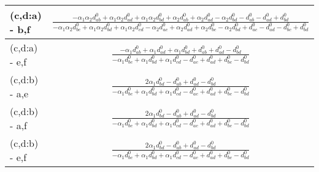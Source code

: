 \documentclass[12pt]{article}
\begin{document}
\begin{longtable}{l|c}
(c,d:a) - b,f& {$\displaystyle \frac{- \alpha_{1} \alpha_{2} d^{\scriptscriptstyle 0}_{ab} + \alpha_{1} \alpha_{2} d^{\scriptscriptstyle 0}_{ad} + \alpha_{1} \alpha_{2} d^{\scriptscriptstyle 0}_{bd} + \alpha_{2} d^{\scriptscriptstyle 0}_{ab} + \alpha_{2} d^{\scriptscriptstyle 0}_{ad} - \alpha_{2} d^{\scriptscriptstyle 0}_{bd} - d^{\scriptscriptstyle 0}_{ab} - d^{\scriptscriptstyle 0}_{ad} + d^{\scriptscriptstyle 0}_{bd}}{- \alpha_{1} \alpha_{2} d^{\scriptscriptstyle 0}_{bc} + \alpha_{1} \alpha_{2} d^{\scriptscriptstyle 0}_{bd} + \alpha_{1} \alpha_{2} d^{\scriptscriptstyle 0}_{cd} - \alpha_{2} d^{\scriptscriptstyle 0}_{ac} + \alpha_{2} d^{\scriptscriptstyle 0}_{ad} + \alpha_{2} d^{\scriptscriptstyle 0}_{bc} - \alpha_{2} d^{\scriptscriptstyle 0}_{bd} + d^{\scriptscriptstyle 0}_{ac} - d^{\scriptscriptstyle 0}_{ad} - d^{\scriptscriptstyle 0}_{bc} + d^{\scriptscriptstyle 0}_{bd}} $}\\[0.4cm]\hline 
(c,d:a) - e,f& {$\displaystyle \frac{- \alpha_{1} d^{\scriptscriptstyle 0}_{ab} + \alpha_{1} d^{\scriptscriptstyle 0}_{ad} + \alpha_{1} d^{\scriptscriptstyle 0}_{bd} + d^{\scriptscriptstyle 0}_{ab} + d^{\scriptscriptstyle 0}_{ad} - d^{\scriptscriptstyle 0}_{bd}}{- \alpha_{1} d^{\scriptscriptstyle 0}_{bc} + \alpha_{1} d^{\scriptscriptstyle 0}_{bd} + \alpha_{1} d^{\scriptscriptstyle 0}_{cd} - d^{\scriptscriptstyle 0}_{ac} + d^{\scriptscriptstyle 0}_{ad} + d^{\scriptscriptstyle 0}_{bc} - d^{\scriptscriptstyle 0}_{bd}} $}\\[0.4cm]\hline 
(c,d:b) - a,e& {$\displaystyle \frac{2 \alpha_{1} d^{\scriptscriptstyle 0}_{bd} - d^{\scriptscriptstyle 0}_{ab} + d^{\scriptscriptstyle 0}_{ad} - d^{\scriptscriptstyle 0}_{bd}}{- \alpha_{1} d^{\scriptscriptstyle 0}_{bc} + \alpha_{1} d^{\scriptscriptstyle 0}_{bd} + \alpha_{1} d^{\scriptscriptstyle 0}_{cd} - d^{\scriptscriptstyle 0}_{ac} + d^{\scriptscriptstyle 0}_{ad} + d^{\scriptscriptstyle 0}_{bc} - d^{\scriptscriptstyle 0}_{bd}} $}\\[0.4cm]\hline 
(c,d:b) - a,f& {$\displaystyle \frac{2 \alpha_{1} d^{\scriptscriptstyle 0}_{bd} - d^{\scriptscriptstyle 0}_{ab} + d^{\scriptscriptstyle 0}_{ad} - d^{\scriptscriptstyle 0}_{bd}}{- \alpha_{1} d^{\scriptscriptstyle 0}_{bc} + \alpha_{1} d^{\scriptscriptstyle 0}_{bd} + \alpha_{1} d^{\scriptscriptstyle 0}_{cd} - d^{\scriptscriptstyle 0}_{ac} + d^{\scriptscriptstyle 0}_{ad} + d^{\scriptscriptstyle 0}_{bc} - d^{\scriptscriptstyle 0}_{bd}} $}\\[0.4cm]\hline 
(c,d:b) - e,f& {$\displaystyle \frac{2 \alpha_{1} d^{\scriptscriptstyle 0}_{bd} - d^{\scriptscriptstyle 0}_{ab} + d^{\scriptscriptstyle 0}_{ad} - d^{\scriptscriptstyle 0}_{bd}}{- \alpha_{1} d^{\scriptscriptstyle 0}_{bc} + \alpha_{1} d^{\scriptscriptstyle 0}_{bd} + \alpha_{1} d^{\scriptscriptstyle 0}_{cd} - d^{\scriptscriptstyle 0}_{ac} + d^{\scriptscriptstyle 0}_{ad} + d^{\scriptscriptstyle 0}_{bc} - d^{\scriptscriptstyle 0}_{bd}} $}\\[0.4cm]\hline 

\end{longtable}
\end{document}

